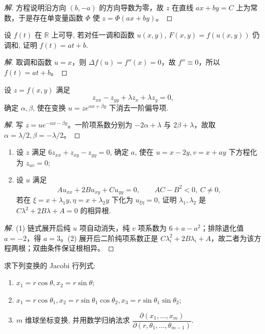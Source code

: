 \documentclass[../../数学分析培优讲义(答案版).tex]{subfiles}
\begin{document}
\begin{proof}[解]
方程说明沿方向 $(b,-a)$ 的方向导数为零，故 $z$ 在直线 $ax+by=C$ 上为常数，于是存在单变量函数 $\Phi$ 使 $z=\Phi(ax+by)$。
\end{proof}

\begin{example}
设 $f(t)$ 在 $\mathbb{R}$ 上可导, 若对任一调和函数 $u(x,y)$, $F(x,y)=f(u(x,y))$ 仍调和, 证明 $f(t)=at+b$.
\end{example}

\begin{proof}[解]
取调和函数 $u=x$，则 $\Delta f(u)=f''(x)=0$，故 $f''\equiv0$，所以 $f(t)=at+b$。
\end{proof}

\begin{example}
设 $z=f(x,y)$ 满足
\[
    z_{xx}-z_{yy}+\lambda z_x+\lambda z_y=0,
\]
确定 $\alpha,\beta$, 使在变换 $u=ze^{\alpha x+\beta y}$ 下消去一阶偏导项.
\end{example}

\begin{proof}[解]
写 $z=u e^{-\alpha x-\beta y}$。一阶项系数分别为 $-2\alpha+\lambda$ 与 $2\beta+\lambda$，故取 $\alpha=\lambda/2,\beta=-\lambda/2$。
\end{proof}

\begin{example}[\markstar]
\begin{enumerate}[label=(\arabic*)]
    \item 设 $z$ 满足 $6z_{xx}+z_{xy}-z_{yy}=0$, 确定 $a$, 使在 $u=x-2y,v=x+ay$ 下方程化为 $z_{uv}=0$;
    \item 设 $u$ 满足
    \[
        Au_{xx}+2Bu_{xy}+Cu_{yy}=0,
        \qquad AC-B^2<0,\ C\ne0,
    \]
    若在 $\xi=x+\lambda_1y,\eta=x+\lambda_2y$ 下化为 $u_{\xi\eta}=0$, 证明 $\lambda_1,\lambda_2$ 是 $C\lambda^2+2B\lambda+A=0$ 的相异根.
\end{enumerate}
\end{example}

\begin{proof}[解]
(1) 链式展开后纯 $u$ 项自动消失，纯 $v$ 项系数为 $6+a-a^2$；排除退化值 $a=-2$，得 $a=3$。(2) 展开后二阶纯项系数正是 $C\lambda_i^2+2B\lambda_i+A$，故二者为该方程两根；双曲条件保证根相异。
\end{proof}

\begin{example}[\markstar]
求下列变换的 Jacobi 行列式:
\begin{enumerate}[label=(\arabic*)]
    \item $x_1=r\cos\theta,x_2=r\sin\theta$;
    \item $x_1=r\cos\theta_1,x_2=r\sin\theta_1\cos\theta_2,x_3=r\sin\theta_1\sin\theta_2$;
    \item $m$ 维球坐标变换, 并用数学归纳法求 $\dfrac{\partial(x_1,\ldots,x_m)}{\partial(r,\theta_1,\ldots,\theta_{m-1})}$.
\end{enumerate}
\end{example}
\end{document}
